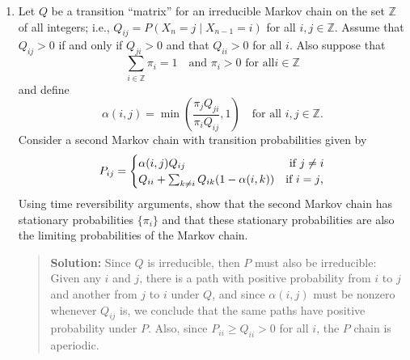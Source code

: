 \documentclass{article}
\begin{document}
\begin{enumerate}
\begin{enumerate}
  \item On the same histogram, indicate the true values that would be expected
  from a sample of size 100,000 from a binomial$(n=30, p=1/2)$ distribution.  See
  the example R code for ideas on how to do this.
  \begin{quotation}{\bf Solution:}
  This is done in the code for part (a).
  \end{quotation}

  \item Explain what you observe from the comparison in part (b). Is the Markov
  chain you are simulating ergodic?
  \begin{quotation}{\bf Solution:}
  Clearly, the observed frequencies are very close to the theoretical stationary probabilities.
  This chain has period 2, so it is not ergodic.
  \end{quotation}

  \end{enumerate}

\item Let $Q$ be a transition ``matrix'' for an irreducible Markov chain on the
set $\mathbb{Z}$ of all integers; i.e., $Q_{ij}=P(X_n=j \mid X_{n-1}=i)$ for all
$i,j\in\mathbb{Z}$. Assume that $Q_{ij}>0$ if and only if $Q_{ji}>0$ and that
$Q_{ii}>0$ for all $i$. Also suppose that
\[
\sum_{i \in \mathbb{Z}} \pi_i = 1 \quad \mbox{and $\pi_i>0$ for all
$i\in\mathbb{Z}$}
\]
and define
\[
\alpha(i,j) = \min\left(\frac{\pi_jQ_{ji}}{\pi_iQ_{ij}}, 1\right) \quad\mbox{for
all $i,j\in\mathbb{Z}$.}
\]
Consider a second Markov chain with transition probabilities given by
\[
P_{ij} =  
  \begin{cases}
  \alpha(i,j) Q_{ij} &  \mbox{ if  $ j \neq i$}  \\
  Q_{ii} + \sum_{k\neq i} Q_{ik}(1-\alpha(i,k)) & \mbox{if $i=j$,}
  \end{cases}
\]
Using time reversibility arguments, show that the second Markov chain has
stationary probabilities $\{\pi_i\}$ and that these stationary probabilities are
also the limiting probabilities of the Markov chain.
  \begin{quotation}{\bf Solution:}
  Since $Q$ is irreducible, then $P$ must
  also be irreducible:  Given any $i$ and $j$, there is a path with positive probability
  from $i$ to $j$ and another
  from $j$ to $i$ under $Q$, and since $\alpha(i,j)$ must be nonzero whenever 
  $Q_{ij}$ is, we conclude that the same paths have positive probability under $P$.
  Also, since $P_{ii}\ge Q_{ii}>0$ for all $i$, the $P$ chain is aperiodic.  
  

\end{quotation}
\end{enumerate}
\end{document}
